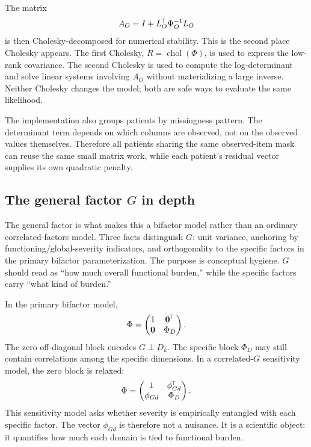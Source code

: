 The matrix
\begin{equation}
A_O=I+L_O^{\!\top}\Psi_O^{-1}L_O
\end{equation}
is then Cholesky-decomposed for numerical stability. This is the second place Cholesky appears. The first
Cholesky, $R=\operatorname{chol}(\Phi)$, is used to express the low-rank covariance. The second Cholesky is used
to compute the log-determinant and solve linear systems involving $A_O$ without materializing a large inverse.
Neither Cholesky changes the model; both are safe ways to evaluate the same likelihood.

The implementation also groups patients by missingness pattern. The determinant term depends on which columns
are observed, not on the observed values themselves. Therefore all patients sharing the same observed-item mask
can reuse the same small matrix work, while each patient's residual vector supplies its own quadratic penalty.

\subsection{The general factor $G$ in depth}
\label{sub:Gdepth}
The general factor is what makes this a bifactor model rather than an ordinary correlated-factors model. Three
facts distinguish $G$: unit variance, anchoring by functioning/global-severity indicators, and orthogonality to
the specific factors in the primary bifactor parameterization. The purpose is conceptual hygiene. $G$ should read
as ``how much overall functional burden,'' while the specific factors carry ``what kind of burden.''

In the primary bifactor model,
\begin{equation}
\Phi=\begin{pmatrix}
1 & \mathbf{0}^{\!\top}\\
\mathbf{0} & \Phi_D
\end{pmatrix}.
\end{equation}
The zero off-diagonal block encodes $G\perp D_k$. The specific block $\Phi_D$ may still contain correlations
among the specific dimensions. In a correlated-$G$ sensitivity model, the zero block is relaxed:
\begin{equation}
\label{eq:corrG}
\Phi=\begin{pmatrix}1 & \phi_{Gd}^{\!\top}\\ \phi_{Gd} & \Phi_D\end{pmatrix}.
\end{equation}
This sensitivity model asks whether severity is empirically entangled with each specific factor. The vector
$\phi_{Gd}$ is therefore not a nuisance. It is a scientific object: it quantifies how much each domain is tied to
functional burden.

